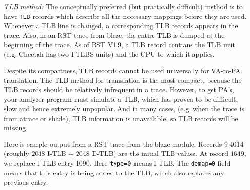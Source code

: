 \documentclass[10pt]{article}
\begin{document}
\textsl{TLB method:} The conceptually preferred (but practically
difficult) method is to have \texttt{TLB} records which describe all the
necessary mappings before they are used.  Whenever a TLB line is
changed, a corresponding TLB records appears in the trace.  Also, in an
RST trace from blaze, the entire TLB is dumped at the beginning of the
trace.  As of RST V1.9, a TLB record contians the TLB unit (e.g. Cheetah
has two I-TLBS units) and the CPU to which it applies.

Despite its compactness, TLB records cannot be used universally for
VA-to-PA translation.  The TLB method for tramslation is the most
compact, because the TLB records should be relatively infrequent in a
trace.  However, to get PA's, your analyzer program must simulate a TLB,
which has proven to be difficult, slow and hence extremely unpopular.
And in many cases, (e.g. when the trace is from atrace or shade), TLB
information is unavailable, so TLB records will be missing.

Here is sample output from a RST trace from the blaze 
module.  Records 9-4014 (roughly 2048 I-TLB + 2048 D-TLB) are the
initial TLB values.  At record 4649, we replace I-TLB entry 1090.  Here
\texttt{type=0} means I-TLB.  The \texttt{demap=0} field means that this
entry is being added to the TLB, which also replaces any previous entry.
\end{document}

